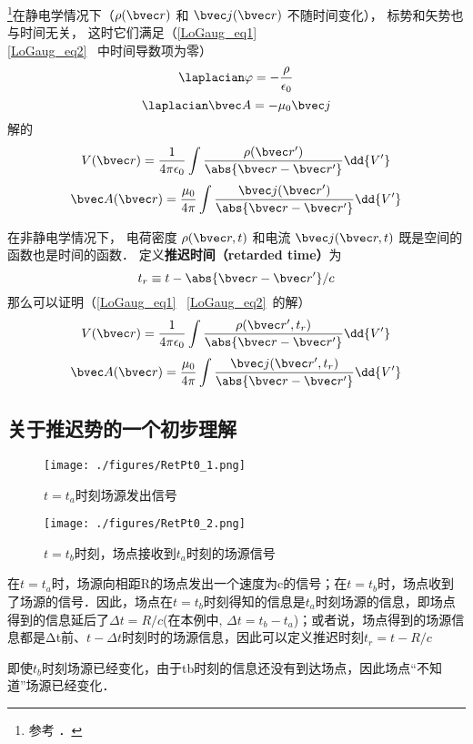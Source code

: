 

\footnote{参考 \cite{GriffE}．}在静电学情况下（$\rho(\bvec r)$ 和 $\bvec j(\bvec r)$ 不随时间变化）， 标势和矢势也与时间无关， 这时它们满足（\autoref{LoGaug_eq1}~ \autoref{LoGaug_eq2}~ 中时间导数项为零）
\begin{equation}
\laplacian \varphi = -\frac{\rho}{\epsilon_0}
\end{equation}
\begin{equation}
\laplacian \bvec A = -\mu_0 \bvec j
\end{equation}
解的
\begin{equation}
V(\bvec r) = \frac{1}{4\pi\epsilon_0} \int \frac{\rho(\bvec r')}{\abs{\bvec r - \bvec r'}} \dd{V'}
\end{equation}
\begin{equation}
\bvec A(\bvec r) = \frac{\mu_0}{4\pi} \int \frac{\bvec j(\bvec r')}{\abs{\bvec r - \bvec r'}} \dd{V'}
\end{equation}

在非静电学情况下， 电荷密度 $\rho(\bvec r, t)$ 和电流 $\bvec j(\bvec r, t)$ 既是空间的函数也是时间的函数． 定义\textbf{推迟时间（retarded time）}为
\begin{equation}
t_r \equiv t - \abs{\bvec r - \bvec r'}/c
\end{equation}
那么可以证明（\autoref{LoGaug_eq1}~ \autoref{LoGaug_eq2}~的解）
\begin{equation}
V(\bvec r) = \frac{1}{4\pi\epsilon_0} \int \frac{\rho(\bvec r', t_r)}{\abs{\bvec r - \bvec r'}} \dd{V'}
\end{equation}
\begin{equation}
\bvec A(\bvec r) = \frac{\mu_0}{4\pi} \int \frac{\bvec j(\bvec r', t_r)}{\abs{\bvec r - \bvec r'}} \dd{V'}
\end{equation}

\subsection{关于推迟势的一个初步理解}
\begin{figure}[ht]
\centering
\texttt{[image: ./figures/RetPt0\_1.png]}
\caption{$t=t_a$时刻场源发出信号} \label{RetPt0_fig1}
\end{figure}
\begin{figure}[ht]
\centering
\texttt{[image: ./figures/RetPt0\_2.png]}
\caption{$t=t_b$时刻，场点接收到$t_a$时刻的场源信号} \label{RetPt0_fig2}
\end{figure}

在$t=t_a$时，场源向相距R的场点发出一个速度为c的信号；在$t=t_b$时，场点收到了场源的信号．因此，场点在$t=t_b$时刻得知的信息是$t_a$时刻场源的信息，即场点得到的信息延后了$\Delta t=R/c$(在本例中, $\Delta t= t_b-t_a$)；或者说，场点得到的场源信息都是Δt前、$t-\Delta t$时刻时的场源信息，因此可以定义推迟时刻$t_r=t-R/c$

即使$t_b$时刻场源已经变化，由于tb时刻的信息还没有到达场点，因此场点“不知道”场源已经变化．